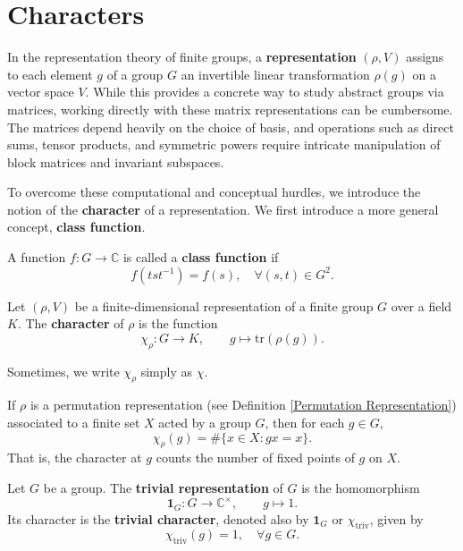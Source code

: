 
\chapter{Characters}

In the representation theory of finite groups, a \textbf{representation} \((\rho, V)\) assigns to each element \(g\) of a group \(G\) an invertible linear transformation \(\rho(g)\) on a vector space \(V\). While this provides a concrete way to study abstract groups via matrices, working directly with these matrix representations can be cumbersome. The matrices depend heavily on the choice of basis, and operations such as direct sums, tensor products, and symmetric powers require intricate manipulation of block matrices and invariant subspaces.

To overcome these computational and conceptual hurdles, we introduce the notion of the \textbf{character} of a representation. We first introduce a more general concept, \textbf{class function}.



\begin{defn}
A function \( f: G \to \mathbb{C} \) is called a \textbf{class function} if 
\[
f(t s t^{-1}) = f(s), \quad \forall( s, t) \in G^2.
\]

\end{defn}

\begin{defn}[Character]\label{def:Character}
Let \((\rho, V)\) be a finite-dimensional representation of a finite group \(G\) over a field \(K\). The \textbf{character} of \(\rho\) is the function
\[
\chi_\rho: G \to K, \qquad g\mapsto \mathrm{tr}(\rho(g)).
\]

Sometimes, we write $\chi_\rho$ simply as $\chi$.
\end{defn}

\begin{remark}
If \(\rho\) is a permutation representation (see Definition \ref{Permutation Representation}) associated to a finite set \(X\) acted by a group $G$, then for each \(g \in G\),
\[
\chi_\rho(g) = \#\{x \in X : gx = x\}.
\]
That is, the character at \(g\) counts the number of fixed points of \(g\) on \(X\).
\end{remark}

\begin{exmp}
Let \(G\) be a group. The \textbf{trivial representation} of \(G\) is the homomorphism
\[
\mathbf{1}_G: G \to \mathbb{C}^\times, \qquad g\mapsto 1.
\]
Its character is the \textbf{trivial character}, denoted also by \( \mathbf{1}_G \) or \( \chi_{\mathrm{triv}} \), given by
\[
\chi_{\mathrm{triv}}(g) = 1 ,\quad \forall g \in G.
\]
\end{exmp}

